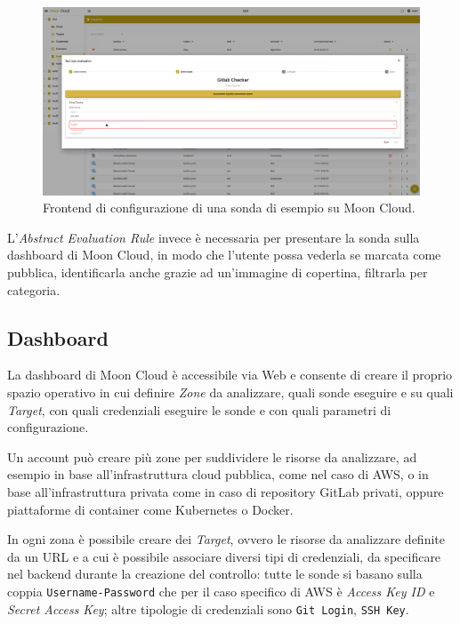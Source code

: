 \begin{center}
\begin{figure}
\centering
\includegraphics[width=\textwidth]{immagini/form.png}
\caption{Frontend di configurazione di una sonda di esempio su Moon Cloud.}
\label{fig:awscloudtrailform}
\end{figure}
\end{center}

L'\textit{Abstract Evaluation Rule} invece è necessaria per presentare la sonda sulla dashboard di Moon Cloud, in modo che l'utente possa vederla se marcata come pubblica, identificarla anche grazie ad un'immagine di copertina, filtrarla per categoria. 

\subsection{Dashboard}
\label{sec:dashboard}

La dashboard di Moon Cloud è accessibile via Web e consente di creare il proprio spazio operativo in cui definire \textit{Zone} da analizzare, quali sonde eseguire e su quali \textit{Target}, con quali credenziali eseguire le sonde e con quali parametri di configurazione.

Un account può creare più zone per suddividere le risorse da analizzare, ad esempio in base all'infrastruttura cloud pubblica, come nel caso di AWS, o in base all'infrastruttura privata come in caso di repository GitLab privati, oppure piattaforme di container come Kubernetes o Docker.  

In ogni zona è possibile creare dei \textit{Target}, ovvero le risorse da analizzare definite da un URL e a cui è possibile associare diversi tipi di credenziali, da specificare nel backend durante la creazione del controllo: tutte le sonde si basano sulla coppia \texttt{Username-Password} che per il caso specifico di AWS è \textit{Access Key ID} e \textit{Secret Access Key}; altre tipologie di credenziali sono \texttt{Git Login}, \texttt{SSH Key}. 

